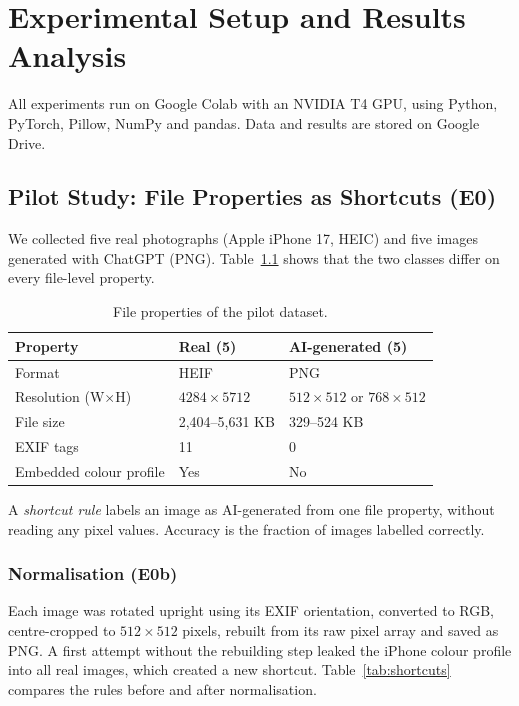 \documentclass{mnnit}
\begin{document}
\chapter{Experimental Setup and Results Analysis}
\label{ch:results}

All experiments run on Google Colab with an NVIDIA T4 GPU, using
Python, PyTorch, Pillow, NumPy and pandas. Data and results are stored
on Google Drive.

\section{Pilot Study: File Properties as Shortcuts (E0)}
We collected five real photographs (Apple iPhone 17, HEIC) and five
images generated with ChatGPT (PNG). Table~\ref{tab:pilot} shows that
the two classes differ on every file-level property.

\begin{table}[htbp]
\centering
\caption{File properties of the pilot dataset.}
\label{tab:pilot}
\small
\begin{tabular}{lll}
\toprule
\textbf{Property} & \textbf{Real (5)} & \textbf{AI-generated (5)}\\
\midrule
Format & HEIF & PNG\\
Resolution (W$\times$H) & $4284\times5712$ & $512\times512$ or $768\times512$\\
File size & 2,404--5,631 KB & 329--524 KB\\
EXIF tags & 11 & 0\\
Embedded colour profile & Yes & No\\
\bottomrule
\end{tabular}
\end{table}

A \emph{shortcut rule} labels an image as AI-generated from one file
property, without reading any pixel values. Accuracy is the fraction
of images labelled correctly.

\subsection*{Normalisation (E0b)}
Each image was rotated upright using its EXIF orientation, converted to
RGB, centre-cropped to $512\times512$ pixels, rebuilt from its raw pixel
array and saved as PNG. A first attempt without the rebuilding step
leaked the iPhone colour profile into all real images, which created a
new shortcut. Table~\ref{tab:shortcuts} compares the rules before and
after normalisation.
\end{document}
